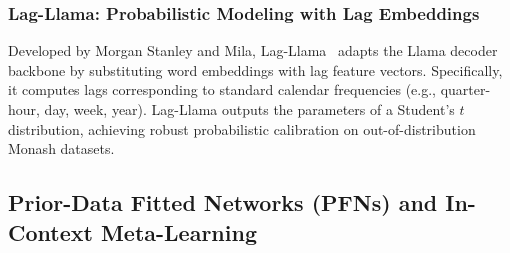 \subsubsection{Lag-Llama: Probabilistic Modeling with Lag Embeddings}
Developed by Morgan Stanley and Mila, Lag-Llama~\cite{rasul2023lagllama} adapts the Llama decoder backbone by substituting word embeddings with lag feature vectors. Specifically, it computes lags corresponding to standard calendar frequencies (e.g., quarter-hour, day, week, year). Lag-Llama outputs the parameters of a Student's $t$ distribution, achieving robust probabilistic calibration on out-of-distribution Monash datasets.

\subsection{Prior-Data Fitted Networks (PFNs) and In-Context Meta-Learning}

